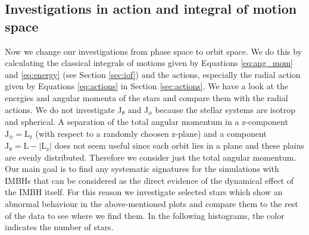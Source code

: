 \subsection{Investigations in action and integral of motion space}\label{sec:action_space}
Now we change our investigations from phase space to orbit space. We do this by calculating the classical integrals of motions given by Equations \eqref{eq:ang_mom} and \eqref{eq:energy} (see Section \ref{sec:iof}) and the actions, especially the radial action given by Equations \eqref{eq:actions} in Section \ref{sec:actions}. We have a look at the energies and angular momenta of the stars and compare them with the radial actions. We do not investigate J$_\theta$ and J$_\phi$ because the stellar systems are isotrop and spherical. A separation of the total angular momentum in a z-component $\mathrm{J_\phi=L_z}$ (with respect to a randomly choosen z-plane) and a component $\mathrm{J_\theta =L-|L_z|}$ does not seem useful since each orbit lies in a plane and these plains are evenly distributed. Therefore we consider just the total angular momentum. Our main goal is to find any systematic signatures for the simulations with \acp{IMBH} that can be considered as the direct evidence of the dynamical effect of the \ac{IMBH} itself. For this reason we investigate selected stars which show an abnormal behaviour in the above-mentioned plots and compare them to the rest of the data to see where we find them. In the following histograms, the color indicates the number of stars.
